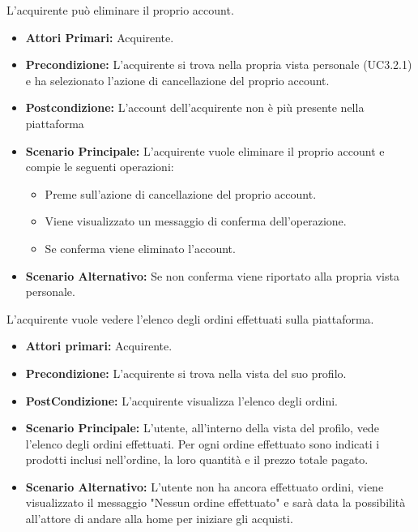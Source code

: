 L'acquirente può eliminare il proprio account.
\begin{itemize}
    \item \textbf{Attori Primari:} Acquirente.
    \item \textbf{Precondizione:} L'acquirente si trova nella propria vista personale (UC3.2.1) e ha selezionato l'azione di cancellazione del proprio account. 
    \item \textbf{Postcondizione:} L'account dell'acquirente non è più presente nella piattaforma
    \item \textbf{Scenario Principale:} L'acquirente vuole eliminare il proprio account e compie le seguenti operazioni:
    \begin{itemize}
        \item Preme sull'azione di cancellazione del proprio account.
        \item Viene visualizzato un messaggio di conferma dell'operazione.
        \item Se conferma viene eliminato l'account.
    \end{itemize}
    \item \textbf{Scenario Alternativo:} Se non conferma viene riportato alla propria vista personale.
\end{itemize}

L'acquirente vuole vedere l'elenco degli ordini effettuati sulla piattaforma.
\begin{itemize}
    \item \textbf{Attori primari:} Acquirente.
    \item \textbf{Precondizione:} L'acquirente si trova nella vista del suo profilo.
    \item \textbf{PostCondizione:} L'acquirente visualizza l'elenco degli ordini.
    \item \textbf{Scenario Principale:} L'utente, all'interno della vista del profilo, vede l'elenco degli ordini effettuati.
        Per ogni ordine effettuato sono indicati i prodotti inclusi nell'ordine, la loro quantità e il prezzo totale pagato.
    \item \textbf{Scenario Alternativo:} L'utente non ha ancora effettuato ordini, viene visualizzato il messaggio "Nessun ordine effettuato" e sarà data la possibilità all'attore di andare alla home per iniziare gli acquisti.
\end{itemize}
